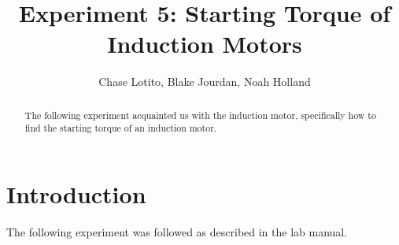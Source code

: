 \documentclass{IEEEtran}
\title{Experiment 5: Starting Torque of Induction Motors}
\author{Chase Lotito, Blake Jourdan, Noah Holland}
\date{}
\begin{document}
\maketitle

\begin{abstract}
    The following experiment acquainted us with the induction motor, specifically how to find the starting torque of an induction motor. 
\end{abstract}

\section{Introduction}

The following experiment was followed as described in the lab manual.



\end{document}
